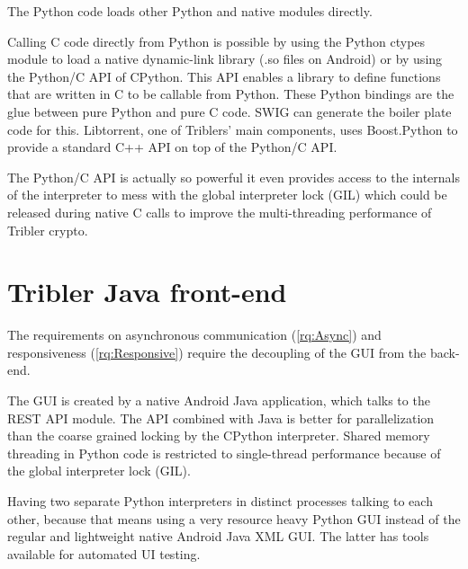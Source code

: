 The Python code loads other Python and native modules directly.

Calling C code directly from Python is possible by using the Python ctypes module to load a native dynamic-link library (.so files on Android) or by using the Python/C API of CPython.
This API enables a library to define functions that are written in C to be callable from Python.
These Python bindings are the glue between pure Python and pure C code.
SWIG can generate the boiler plate code for this.
Libtorrent, one of Triblers' main components, uses Boost.Python to provide a standard C++ API on top of the Python/C API.

The Python/C API is actually so powerful it even provides access to the internals of the interpreter to mess with the global interpreter lock (GIL) which could be released during native C calls to improve the multi-threading performance of Tribler crypto.


\section{Tribler Java front-end}
The requirements on asynchronous communication (\ref{rq:Async}) and responsiveness (\ref{rq:Responsive}) require the decoupling of the GUI from the back-end.

The GUI is created by a native Android Java application, which talks to the REST API module.
The API combined with Java is better for parallelization than the coarse grained locking by the CPython interpreter.
Shared memory threading in Python code is restricted to single-thread performance because of the global interpreter lock (GIL).

Having two separate Python interpreters in distinct processes talking to each other, because that means using a very resource heavy Python GUI instead of the regular and lightweight native Android Java XML GUI.
The latter has tools available for automated UI testing.

